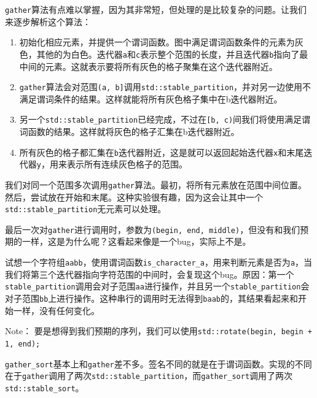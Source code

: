 
\texttt{gather}算法有点难以掌握，因为其非常短，但处理的是比较复杂的问题。让我们来逐步解析这个算法：


\begin{enumerate}
\item 初始化相应元素，并提供一个谓词函数。图中满足谓词函数条件的元素为灰色，其他的为白色。迭代器\texttt{a}和\texttt{c}表示整个范围的长度，并且迭代器\texttt{b}指向了最中间的元素。这就表示要将所有灰色的格子聚集在这个迭代器附近。

\item \texttt{gather}算法会对范围\texttt{(a, b]}调用\texttt{std::stable\_partition}，并对另一边使用不满足谓词条件的结果。这样就能将所有灰色格子集中在b迭代器附近。

\item 另一个\texttt{std::stable\_partition}已经完成，不过在\texttt{[b, c)}间我们将使用满足谓词函数的结果。这样就将灰色的格子汇集在b迭代器附近。

\item 所有灰色的格子都汇集在\texttt{b}迭代器附近，这是就可以返回起始迭代器\texttt{x}和末尾迭代器\texttt{y}，用来表示所有连续灰色格子的范围。

\end{enumerate}

我们对同一个范围多次调用\texttt{gather}算法。最初，将所有元素放在范围中间位置。然后，尝试放在开始和末尾。这种实验很有趣，因为这会让其中一个\texttt{std::stable\_partition}无元素可以处理。

最后一次对\texttt{gather}进行调用时，参数为\texttt{(begin, end, middle)}，但没有和我们预期的一样，这是为什么呢？这看起来像是一个bug，实际上不是。

试想一个字符组\texttt{aabb}，使用谓词函数\texttt{is\_character\_a}，用来判断元素是否为\texttt{a}，当我们将第三个迭代器指向字符范围的中间时，会复现这个bug。原因：第一个\texttt{stable\_partition}调用会对子范围\texttt{aa}进行操作，并且另一个\texttt{stable\_partition}会对子范围\texttt{bb}上进行操作。这种串行的调用时无法得到\texttt{baab}的，其结果看起来和开始一样，没有任何变化。

\begin{myInfoBox}
Note： 要是想得到我们预期的序列，我们可以使用\texttt{std::rotate(begin, begin + 1, end);}
\end{myInfoBox}

\texttt{gather\_sort}基本上和\texttt{gather}差不多。签名不同的就是在于谓词函数。实现的不同在于\texttt{gather}调用了两次\texttt{std::stable\_partition}，而\texttt{gather\_sort}调用了两次\texttt{std::stable\_sort}。


